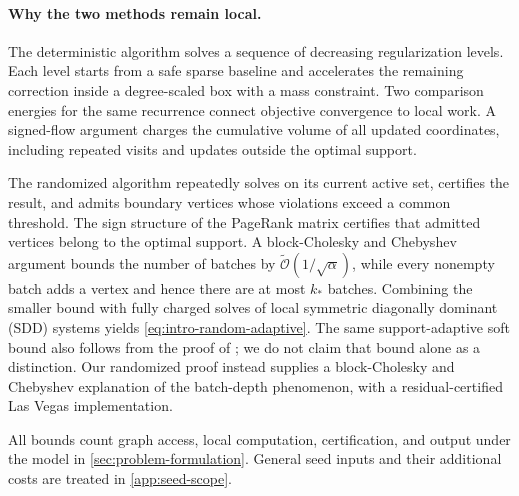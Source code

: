 \paragraph{Why the two methods remain local.}
The deterministic algorithm solves a sequence of decreasing regularization
levels. Each level starts from a safe sparse baseline and accelerates the
remaining correction inside a degree-scaled box with a mass constraint.
Two comparison energies for the same recurrence connect objective
convergence to local work. A signed-flow argument charges the cumulative
volume of all updated coordinates, including repeated visits and updates
outside the optimal support.

The randomized algorithm repeatedly solves on its current active set,
certifies the result, and admits boundary vertices whose violations exceed
a common threshold. The sign structure of the PageRank matrix certifies
that admitted vertices belong to the optimal support. A block-Cholesky and
Chebyshev argument bounds the number of batches by
$\widetilde{\mathcal{O}}(1/\sqrt\alpha)$, while every nonempty batch adds a
vertex and hence there are at most $k_*$ batches. Combining the smaller
bound with fully charged solves of local symmetric diagonally dominant
(SDD) systems yields
\cref{eq:intro-random-adaptive}.
The same support-adaptive soft bound also follows from the proof of
\citet[Theorem~1.3]{cui2026accelerating}; we do not claim that bound alone
as a distinction. Our randomized proof instead supplies a block-Cholesky
and Chebyshev explanation of the batch-depth phenomenon, with a
residual-certified Las Vegas implementation.

All bounds count graph access, local computation, certification, and
output under the model in \cref{sec:problem-formulation}. General seed
inputs and their additional costs are treated in \cref{app:seed-scope}.
